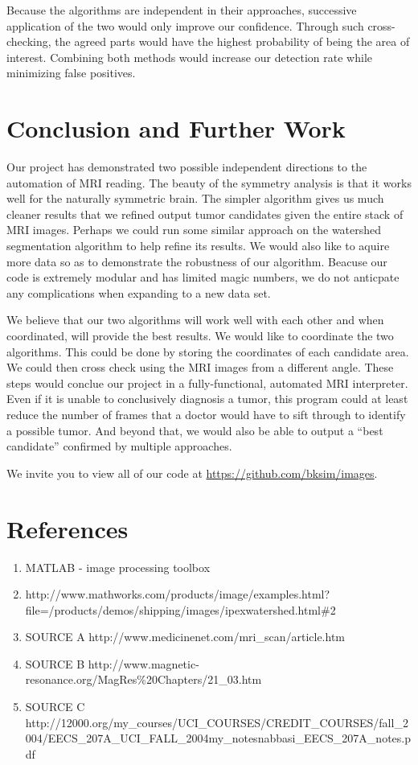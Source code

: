 \documentclass[12pt]{article}
\theoremstyle{plain}%
\theoremstyle{definition}
\theoremstyle{remark}
\begin{document}
Because the algorithms are independent in their approaches, successive application of the two would only improve our confidence.  Through such cross-checking, the agreed parts would have the highest probability of being the area of interest.  Combining both methods would increase our detection rate while minimizing false positives.

\section{Conclusion and Further Work}

Our project has demonstrated two possible independent directions to the automation of MRI reading.  The beauty of the symmetry analysis is that it works well for the naturally symmetric brain.  The simpler algorithm gives us much cleaner results that we refined output tumor candidates given the entire stack of MRI images.  Perhaps we could run some similar approach on the watershed segmentation algorithm to help refine its results.  We would also like to aquire more data so as to demonstrate the robustness of our algorithm.  Beacuse our code is extremely modular and has limited magic numbers, we do not anticpate any complications when expanding to a new data set.

We believe that our two algorithms will work well with each other and when coordinated, will provide the best results.  We would like to coordinate the two algorithms.  This could be done by storing the coordinates of each candidate area.  We could then cross check using the MRI images from a different angle.  These steps would conclue our project in a fully-functional, automated MRI interpreter.  Even if it is unable to conclusively diagnosis a tumor, this program could at least reduce the number of frames that a doctor would have to sift through to identify a possible tumor.  And beyond that, we would also be able to output a “best candidate” confirmed by multiple approaches.

We invite you to view all of our code at \url{https://github.com/bksim/images}.
\section{References}
\begin{enumerate}
\item \textsc{MATLAB} - image processing toolbox
\item http://www.mathworks.com/products/image/examples.html?file=/products/demos/shipping/images/ipexwatershed.html\#2
\item SOURCE A http://www.medicinenet.com/mri\_scan/article.htm
\item SOURCE B http://www.magnetic-resonance.org/MagRes\%20Chapters/21\_03.htm
\item SOURCE C http://12000.org/my\_courses/UCI\_COURSES/CREDIT\_COURSES/fall\_2004/EECS\_207A\_UCI\_FALL\_2004\/my\_notes\/nabbasi\_EECS\_207A\_notes.pdf

\end{enumerate}
	
\end{document}
